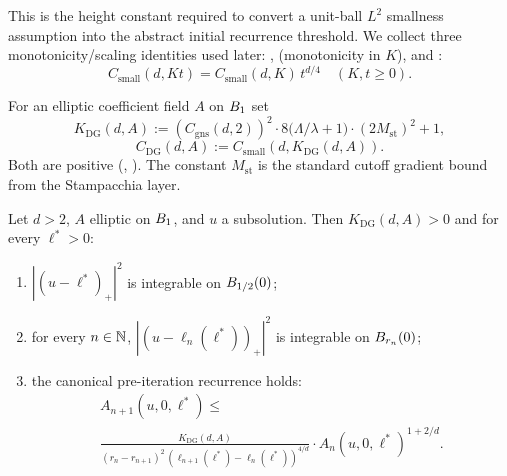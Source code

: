 This is the height constant required to convert a unit-ball $L^2$
smallness assumption into the abstract initial recurrence threshold.
We collect three monotonicity/scaling identities used later:
,
 (monotonicity in $K$), and
:
\begin{equation*}
  C_{\mathrm{small}}(d, K t) =
    C_{\mathrm{small}}(d, K) \, t^{d/4} \quad (K, t \ge 0).
\end{equation*}

\begin{definition}
\label{def:K_DeGiorgi_subsolution}
\leanok
{}
For an elliptic coefficient field $A$ on $B_{1}$ set
\begin{equation*}
  K_{\mathrm{DG}}(d, A) := (C_{\mathrm{gns}}(d, 2))^2 \cdot
    8\bigl(\Lambda/\lambda + 1\bigr) \cdot (2 M_{\mathrm{st}})^2 + 1,
\end{equation*}
\begin{equation*}
  C_{\mathrm{DG}}(d, A) := C_{\mathrm{small}}(d, K_{\mathrm{DG}}(d, A)).
\end{equation*}
Both are positive (,
). The constant
$M_{\mathrm{st}}$ is the standard cutoff gradient bound from the
Stampacchia layer.
\end{definition}

\begin{theorem}
\label{thm:deGiorgi_iteration_package_on_unitBall_of_subsolution}
\leanok
{}
Let $d > 2$, $A$ elliptic on $B_{1}$, and $u$ a subsolution. Then
$K_{\mathrm{DG}}(d,A) > 0$ and for every $\ell^* > 0$:
\begin{enumerate}
\item $|(u-\ell^*)_+|^2$ is integrable on $B_{1/2}(0)$;
\item for every $n \in \mathbb{N}$, $|(u-\ell_n(\ell^*))_+|^2$ is integrable
on $B_{r_n}(0)$;
\item the canonical pre-iteration recurrence holds:
\begin{multline*}
  A_{n+1}(u,0,\ell^*) \le \\
   \frac{K_{\mathrm{DG}}(d,A)}{(r_n - r_{n+1})^2 \,
     (\ell_{n+1}(\ell^*)-\ell_n(\ell^*))^{4/d}} \cdot
   A_n(u,0,\ell^*)^{1 + 2/d}.
\end{multline*}
\end{enumerate}
\end{theorem}

